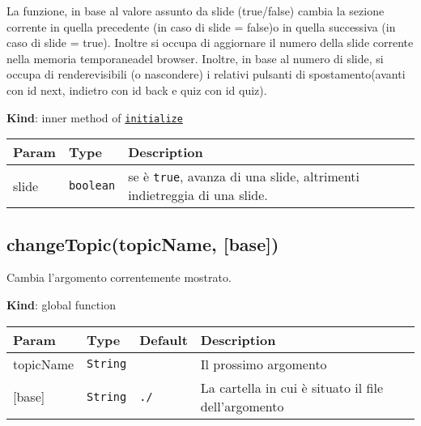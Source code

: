 La funzione, in base al valore assunto da slide (true/false) cambia la
sezione corrente in quella precedente (in caso di slide = false)o in
quella successiva (in caso di slide = true). Inoltre si occupa di
aggiornare il numero della slide corrente nella memoria temporaneadel
browser. Inoltre, in base al numero di slide, si occupa di
renderevisibili (o nascondere) i relativi pulsanti di spostamento(avanti
con id next, indietro con id back e quiz con id quiz).

\textbf{Kind}: inner method of
\protect\hyperlink{initialize}{\texttt{initialize}}

\begin{tabularx}{\textwidth}{XXX}
\toprule
\begin{minipage}[b]{0.30\columnwidth}\raggedright
Param\strut
\end{minipage} & \begin{minipage}[b]{0.30\columnwidth}\raggedright
Type\strut
\end{minipage} & \begin{minipage}[b]{0.30\columnwidth}\raggedright
Description\strut
\end{minipage}\tabularnewline
\midrule
\endhead
\begin{minipage}[t]{0.30\columnwidth}\raggedright
slide\strut
\end{minipage} & \begin{minipage}[t]{0.30\columnwidth}\raggedright
\texttt{boolean}\strut
\end{minipage} & \begin{minipage}[t]{0.30\columnwidth}\raggedright
se è \texttt{true}, avanza di una slide, altrimenti indietreggia di una
slide.\strut
\end{minipage}\tabularnewline
\bottomrule
\end{tabularx}

\protect\hypertarget{changeTopic}{}{}

\hypertarget{changetopictopicname-base}{%
\subsection{changeTopic(topicName,
{[}base{]})}\label{changetopictopicname-base}}

Cambia l'argomento correntemente mostrato.

\textbf{Kind}: global function

\begin{tabularx}{\textwidth}{XXXX}
\toprule
Param & Type & Default & Description\tabularnewline
\midrule
\endhead
topicName & \texttt{String} & & Il prossimo argomento\tabularnewline
{[}base{]} & \texttt{String} & \texttt{./} & La cartella in cui è
situato il file dell'argomento\tabularnewline
\bottomrule
\end{tabularx}

